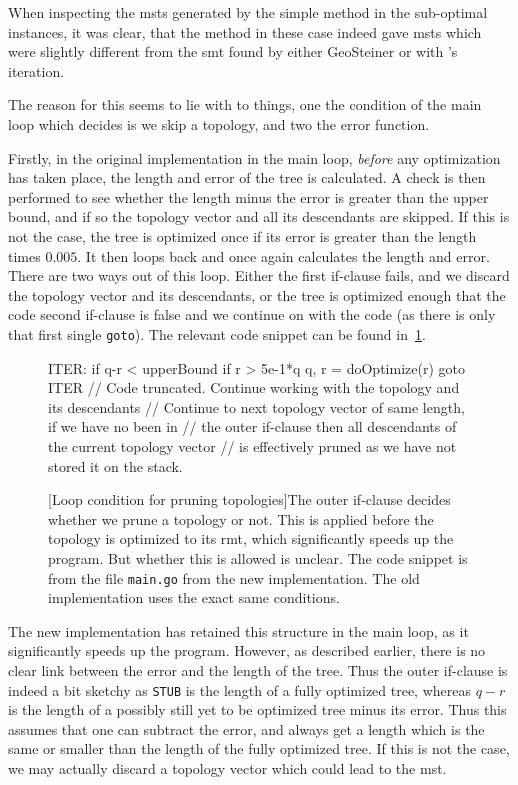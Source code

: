 When inspecting the \acp{mst} generated by the simple method in the sub-optimal
instances, it was clear, that the method in these case indeed gave \acp{mst}
which were slightly different from the \ac{smt} found by either GeoSteiner or
with \citeauthor{smith1992}'s iteration. 

The reason for this seems to lie with to things, one the condition of the main
loop which decides is we skip a topology, and two the error function.

Firstly, in the original implementation in the main loop, \textit{before} any
optimization has taken place, the length and error of the tree is calculated. A
check is then performed to see whether the length minus the error is greater
than the upper bound, and if so the topology vector and all its descendants are
skipped. If this is not the case, the tree is optimized once if its error is
greater than the length times $0.005$. It then loops back and once again
calculates the length and error. There are two ways out of this loop. Either the
first if-clause fails, and we discard the topology vector and its descendants,
or the tree is optimized enough that the code second if-clause is false and we
continue on with the code (as there is only that first single \texttt{goto}).
The relevant code snippet can be found in~\cref{fig:loop-condition-pruning}. 

\begin{figure}[htbp]
  \begin{go-code}
    ITER:
    if q-r < upperBound {
      if r > 5e-1*q {
        q, r = doOptimize(r)
        goto ITER
      }
      // Code truncated. Continue working with the topology and its descendants
    }
    // Continue to next topology vector of same length, if we have no been in
    // the outer if-clause then all descendants of the current topology vector
    // is effectively pruned as we have not stored it on the stack.
  \end{go-code}
  [Loop condition for pruning topologies]{The outer if-clause
    decides whether we prune a topology or not. This is applied before the
    topology is optimized to its \acs{rmt}, which significantly speeds up the
    program. But whether this is allowed is unclear. The code snippet is from
    the file \texttt{main.go} from the new implementation. The old
    implementation uses the exact same conditions.\label{fig:loop-condition-pruning}}
\end{figure}

The new implementation has retained this structure in the main loop, as it
significantly speeds up the program. However, as described earlier, there is no
clear link between the error and the length of the tree. Thus the outer
if-clause is indeed a bit sketchy as \texttt{STUB} is the length of a fully
optimized tree, whereas $q - r$ is the length of a possibly still yet to be optimized
tree minus its error. Thus this assumes that one can subtract the error, and
always get a length which is the same or smaller than the length of the fully
optimized tree. If this is not the case, we may actually discard a topology
vector which could lead to the \ac{mst}.

